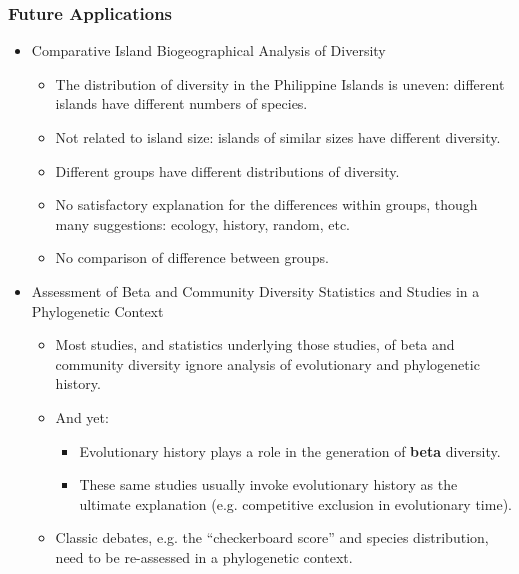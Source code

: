 \documentclass[11pt,t]{beamer}
\begin{document}
\begin{frame}
	\frametitle{Future Applications}
	
	\begin{itemize}

	\item{Comparative Island Biogeographical Analysis of Diversity}
		\begin{itemize}
			\item The distribution of diversity in the Philippine Islands is uneven: different islands have different numbers of species.
			\item Not related to island size: islands of similar sizes have different diversity.	
			\item Different groups have different distributions of diversity.		
			\item No satisfactory explanation for the differences within groups, though many suggestions: ecology, history, random, etc.
			\item No comparison of difference between groups.
		\end{itemize}
	
	\item{Assessment of Beta and Community Diversity Statistics and Studies in a Phylogenetic Context}
		\begin{itemize}
			\item Most studies, and statistics underlying those studies, of beta and community diversity ignore analysis of evolutionary and phylogenetic history.
			\item And yet:
				\begin{itemize}
					\item Evolutionary history plays a role in the generation of \textbf{beta} diversity.
					\item These same studies usually invoke evolutionary history as the ultimate explanation (e.g. competitive exclusion in evolutionary time).
				\end{itemize}
			\item Classic debates, e.g. the ``checkerboard score'' and species distribution, need to be re-assessed in a phylogenetic context.
		\end{itemize}
	
	\end{itemize}
\end{frame}
\end{document}

